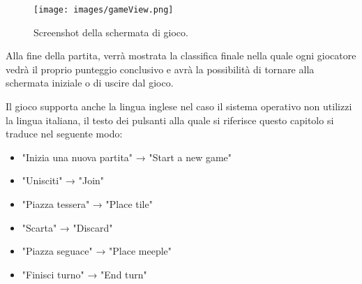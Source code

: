 \begin{figure}[ht]
    \centering\texttt{[image: images/gameView.png]}
    \caption{Screenshot della schermata di gioco.}
\end{figure}

Alla fine della partita, verrà mostrata la classifica finale nella quale ogni giocatore vedrà il proprio punteggio conclusivo e avrà la possibilità di tornare alla schermata iniziale o di uscire dal gioco.

Il gioco supporta anche la lingua inglese nel caso il sistema operativo non utilizzi la lingua italiana, il testo dei pulsanti alla quale si riferisce questo capitolo si traduce nel seguente modo:
\begin{itemize}
    \item "Inizia una nuova partita" → "Start a new game"
    \item "Unisciti" → "Join"
    \item "Piazza tessera" → "Place tile"
    \item "Scarta" → "Discard"
    \item "Piazza seguace" → "Place meeple"
    \item "Finisci turno" → "End turn"
\end{itemize}
